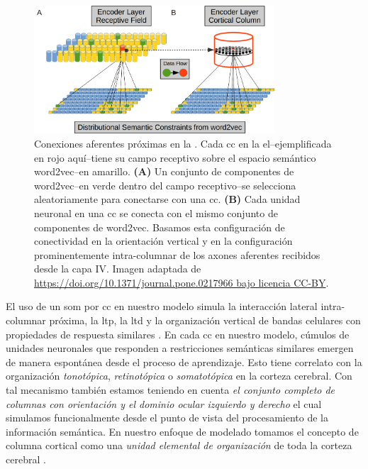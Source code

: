{\begin{figure}[ht!]
    \centering
    \includegraphics[width=0.8\textwidth]{EncoderProximalConnections1.png}
    \caption{Conexiones aferentes próximas en la . Cada \gls{cc} en la \gls{el}--ejemplificada en rojo aquí--tiene su campo receptivo sobre el espacio semántico word2vec--en amarillo.
    \textbf{(A)} Un conjunto de componentes de word2vec--en verde dentro del campo receptivo--se selecciona aleatoriamente para conectarse con una \gls{cc}.
    \textbf{(B)} Cada unidad neuronal en una \gls{cc} se conecta con el mismo conjunto de componentes de word2vec. Basamos esta configuración de conectividad en la orientación vertical y en la configuración prominentemente intra-columnar de los axones aferentes recibidos desde la capa IV.
    Imagen adaptada de \url{https://doi.org/10.1371/journal.pone.0217966 bajo licencia CC-BY}.}
    \label{fig:EncoderProximalConnections1}
\end{figure}

El uso de un \gls{som} por \gls{cc} en nuestro modelo simula la interacción lateral intra-columnar próxima, la \gls{ltp}, la \gls{ltd} y la organización vertical de bandas celulares con propiedades de respuesta similares \cite{mountcastle_1955,Haueis2016}.
En cada \gls{cc} en nuestro modelo, cúmulos de unidades neuronales que responden a restricciones semánticas similares emergen de manera espontánea desde el proceso de aprendizaje.
Esto tiene correlato con la organización \emph{tonotópica}, \emph{retinotópica} o \emph{somatotópica} en la corteza cerebral.
Con tal mecanismo también estamos teniendo en cuenta \emph{el conjunto completo de columnas con orientación y el dominio ocular izquierdo y derecho} \cite{doi:10.1002/cne.901580305} el cual simulamos funcionalmente desde el punto de vista del procesamiento de la información semántica.
En nuestro enfoque de modelado tomamos el concepto de columna cortical como una \emph{unidad elemental de organización} de toda la corteza cerebral \cite{doi:10.1152/jn.1957.20.4.408,Mountcastle1978AnOP,10.1093/brain/120.4.701}. 


}
